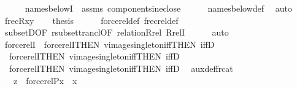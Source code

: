 \begin{isabellebody}
\ \ \ \ \isamarkupfalse%
\ names{\isacharunderscore}{\kern0pt}belowI\ \ assms\ components{\isacharunderscore}{\kern0pt}in{\isacharunderscore}{\kern0pt}eclose\isanewline
\ \ \ \ \isamarkupfalse%
\ names{\isacharunderscore}{\kern0pt}below{\isacharunderscore}{\kern0pt}def\ \isamarkupfalse%
\ auto\isanewline
\ \ \isamarkupfalse%
\ {\isacartoucheopen}frecR{\isacharparenleft}{\kern0pt}{\isacharquery}{\kern0pt}x{\isacharcomma}{\kern0pt}{\isacharquery}{\kern0pt}y{\isacharparenright}{\kern0pt}{\isacartoucheclose}\isanewline
\ \ \isamarkupfalse%
\ {\isacharquery}{\kern0pt}thesis\isanewline
\ \ \ \ \isamarkupfalse%
\ forcerel{\isacharunderscore}{\kern0pt}def\ frecrel{\isacharunderscore}{\kern0pt}def\isanewline
\ \ \ \ \isamarkupfalse%
\ subsetD{\isacharbrackleft}{\kern0pt}OF\ r{\isacharunderscore}{\kern0pt}subset{\isacharunderscore}{\kern0pt}trancl{\isacharbrackleft}{\kern0pt}OF\ relation{\isacharunderscore}{\kern0pt}Rrel{\isacharbrackright}{\kern0pt}{\isacharbrackright}{\kern0pt}\ RrelI\isanewline
\ \ \ \ \isamarkupfalse%
\ auto\isanewline
{}\isamarkupfalse%
%
\endisatagproof
{\isafoldproof}%
%
\isadelimproof
\isanewline
%
\endisadelimproof
\isanewline
{}\isamarkupfalse%
\ forcerelI\ {\isacharequal}{\kern0pt}\ forcerelI{}{\isacharbrackleft}{\kern0pt}THEN\ vimage{\isacharunderscore}{\kern0pt}singleton{\isacharunderscore}{\kern0pt}iff{\isacharbrackleft}{\kern0pt}THEN\ iffD{}{\isacharbrackright}{\kern0pt}{\isacharbrackright}{\kern0pt}\isanewline
\ \ forcerelI{}{\isacharbrackleft}{\kern0pt}THEN\ vimage{\isacharunderscore}{\kern0pt}singleton{\isacharunderscore}{\kern0pt}iff{\isacharbrackleft}{\kern0pt}THEN\ iffD{}{\isacharbrackright}{\kern0pt}{\isacharbrackright}{\kern0pt}\isanewline
\ \ forcerelI{}{\isacharbrackleft}{\kern0pt}THEN\ vimage{\isacharunderscore}{\kern0pt}singleton{\isacharunderscore}{\kern0pt}iff{\isacharbrackleft}{\kern0pt}THEN\ iffD{}{\isacharbrackright}{\kern0pt}{\isacharbrackright}{\kern0pt}\isanewline
\isanewline
{}\isamarkupfalse%
\ \ aux{\isacharunderscore}{\kern0pt}def{\isacharunderscore}{\kern0pt}frc{\isacharunderscore}{\kern0pt}at{\isacharcolon}{\kern0pt}\isanewline
\ \ \ {\isachardoublequoteopen}z\ {\isasymin}\ forcerel{\isacharparenleft}{\kern0pt}P{\isacharcomma}{\kern0pt}x{\isacharparenright}{\kern0pt}\ {\isacharminus}{\kern0pt}{\isacharbackquote}{\kern0pt}{\isacharbackquote}{\kern0pt}\ {\isacharbraceleft}{\kern0pt}x{\isacharbraceright}{\kern0pt}{\isachardoublequoteclose}\isanewline

\end{isabellebody}
